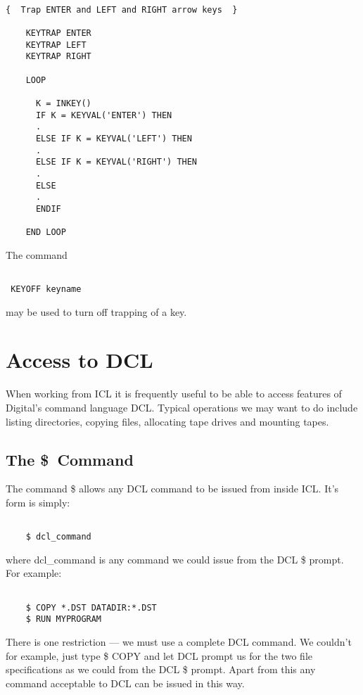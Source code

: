 \documentclass[twoside,11pt]{report}
\newcommand{\xlabel}[1]{}
\begin{document}
\begin{verbatim}

{  Trap ENTER and LEFT and RIGHT arrow keys  }

    KEYTRAP ENTER
    KEYTRAP LEFT
    KEYTRAP RIGHT

    LOOP

      K = INKEY()
      IF K = KEYVAL('ENTER') THEN
      .
      ELSE IF K = KEYVAL('LEFT') THEN
      .
      ELSE IF K = KEYVAL('RIGHT') THEN
      .
      ELSE
      .
      ENDIF

    END LOOP

\end{verbatim}

The command
\begin{verbatim}

 KEYOFF keyname

\end{verbatim}
 may be used to turn off trapping of a key.


\chapter{\xlabel{access_to_dcl}Access to DCL}
When working from ICL it is frequently useful to be able to access features of
Digital's command language DCL.
Typical operations we may want to do include listing directories, copying
files, allocating tape drives and mounting tapes.

\section{\xlabel{the_command}The \$\ Command}
The command \$ allows any DCL command to be issued from inside ICL. It's
form is simply:
\begin{verbatim}

    $ dcl_command

\end{verbatim}
where dcl\_command is any command we could issue from the DCL \$ prompt.
For example:

\begin{verbatim}

    $ COPY *.DST DATADIR:*.DST
    $ RUN MYPROGRAM

\end{verbatim}
There is one restriction --- we must use a complete DCL command. We couldn't
for example, just type \$ COPY and let DCL prompt us for the two file
specifications as we could from the DCL \$ prompt. Apart from this any
command acceptable to DCL can be issued in this way.
\end{document}
